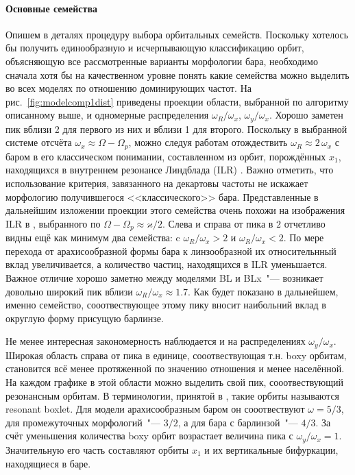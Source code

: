 \documentclass[tikz]{trlnotes}
\begin{document}
\paragraph{Основные семейства}
Опишем в деталях процедуру выбора орбитальных семейств. 
Поскольку хотелось бы получить единообразную и исчерпывающую классификацию орбит, объясняющую все рассмотренные
варианты морфологии бара, необходимо сначала хотя бы на качественном уровне понять какие семейства можно выделить
во всех моделях по отношению доминирующих частот. На рис.~\ref{fig:modelcomp1dist} приведены проекции области,
выбранной по алгоритму описанному выше, и одномерные распределения $ω_R/ω_x$, $ω_y/ω_x$. Хорошо заметен пик вблизи
2 для первого из них и вблизи 1 для второго. Поскольку в выбранной системе отсчёта $ω_x \approx Ω - Ω_p$, можно
следуя работам \citet{gajda2016,portail2015} отождествить $ω_R \approx 2\, ω_x$ с баром в его классическом
понимании, составленном из орбит,
порождённых $x_1$, находящихся в внутреннем резонансе Линдблада (ILR) \citep{athanassoula2003}.
Важно отметить, что использование критерия, завязанного на декартовы
частоты не искажает морфологию получившегося <<классического>> бара. Представленные в дальнейшим изложении
проекции этого семейства очень похожи на изображения ILR в \citet[Fig.~10]{ceverino2007}, выбранного по $Ω - Ω_p
\approx ϰ/2$. Слева и справа от пика в $2$ отчетливо видны ещё как минимум два семейства:
c $ω_R/ω_x > 2$ и $ω_R/ω_x < 2$.  По мере перехода от арахисообразной формы бара к линзообразной их
относительнный вклад увеличивается, а количество частиц, находящихся в ILR уменьшается. Важное отличие хорошо
заметно между моделями BL и BLx~"--- возникает довольно широкий пик вблизи $ω_R/ω_x \approx 1.7$. Как будет
показано в дальнейшем, именно семейство, сооотвествующее этому пику вносит наибольний вклад в округлую форму
присущую барлинзе.

Не менее интересная закономерность наблюдается и на распределениях $ω_y/ω_x$. Широкая область справа от пика в
единице, сооотвествующая т.н. boxy орбитам, становится всё менее протяженной по значению отношения и менее
населённой. На каждом графике в этой области можно выделить свой пик, сооотвествующий резонансным орбитам. В
терминологии, принятой в \cite{valluri2016}, такие орбиты называются resonant boxlet. Для модели арахисообразным
баром он сооотвествуют $ω=5/3$, для промежуточных морфологий~"--- $3/2$, а для бара с барлинзой~"--- $4/3$.
За счёт уменьшения количества boxy орбит возрастает величина пика с $ω_y/ω_x = 1$. Значительную его часть
составляют орбиты $x_1$ и их вертикальные бифуркации,
находящиеся в баре.
\end{document}

